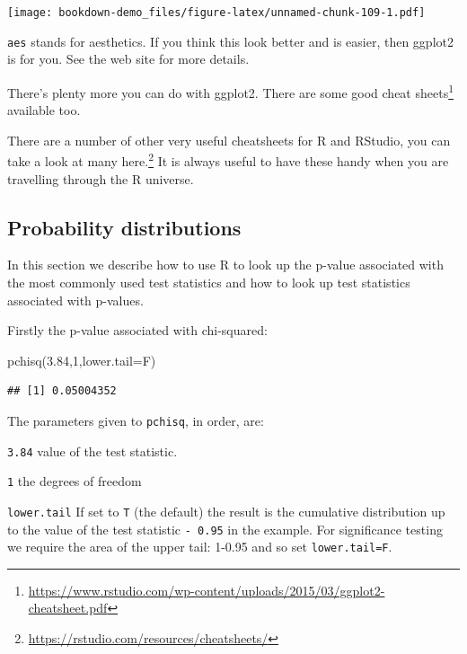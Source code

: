 \documentclass[
]{book}
\makeatletter
\newenvironment{Shaded}{\begin{snugshade}}{\end{snugshade}}
\newcommand{\AttributeTok}[1]{\textcolor[rgb]{0.77,0.63,0.00}{#1}}
\newcommand{\DecValTok}[1]{\textcolor[rgb]{0.00,0.00,0.81}{#1}}
\newcommand{\FloatTok}[1]{\textcolor[rgb]{0.00,0.00,0.81}{#1}}
\newcommand{\FunctionTok}[1]{\textcolor[rgb]{0.00,0.00,0.00}{#1}}
\newcommand{\NormalTok}[1]{#1}
\renewcommand{\href}[2]{#2\footnote{\url{#1}}}
\newenvironment{kframe}{%
\medskip{}
\setlength{\fboxsep}{.8em}
 \def\at@end@of@kframe{}%
 \ifinner\ifhmode%
  \def\at@end@of@kframe{\end{minipage}}%
  \begin{minipage}{\columnwidth}%
 \fi\fi%
 \def\FrameCommand##1{\hskip\@totalleftmargin \hskip-\fboxsep
 \colorbox{shadecolor}{##1}\hskip-\fboxsep
     \hskip-\linewidth \hskip-\@totalleftmargin \hskip\columnwidth}%
 \MakeFramed {\advance\hsize-\width
   \@totalleftmargin\z@ \linewidth\hsize
   \@setminipage}}%
 {\par\unskip\endMakeFramed%
 \at@end@of@kframe}
\newenvironment{rmdblock}[1]
  {
  \begin{itemize}
  \renewcommand{\labelitemi}{
    \raisebox{-.7\height}[0pt][0pt]{
      {\setkeys{Gin}{width=3em,keepaspectratio}\texttt{[image: images/\#1]}}
    }
  }
  \setlength{\fboxsep}{1em}
  \begin{kframe}
  \item
  }
  {
  \end{kframe}
  \end{itemize}
  }
\newenvironment{rmdnote}
  {\begin{rmdblock}{note}}
  {\end{rmdblock}}
\makeatother
\begin{document}
\texttt{[image: bookdown-demo\_files/figure-latex/unnamed-chunk-109-1.pdf]}

\texttt{aes} stands for aesthetics. If you think this look better and is easier, then ggplot2 is for you. See the web site for more details.

There's plenty more you can do with ggplot2. There are some good \href{https://www.rstudio.com/wp-content/uploads/2015/03/ggplot2-cheatsheet.pdf}{cheat sheets} available too.

\begin{rmdnote}
There are a number of other very useful cheatsheets for R and RStudio, you can take a look at many \href{https://rstudio.com/resources/cheatsheets/}{here.} It is always useful to have these handy when you are travelling through the R universe.
\end{rmdnote}

\hypertarget{probability-distributions}{%
\subsection{Probability distributions}\label{probability-distributions}}

In this section we describe how to use R to look up the p-value associated with the most
commonly used test statistics and how to look up test statistics associated with p-values.

Firstly the p-value associated with chi-squared:

\begin{Shaded}
\begin{Highlighting}[]
\FunctionTok{pchisq}\NormalTok{(}\FloatTok{3.84}\NormalTok{,}\DecValTok{1}\NormalTok{,}\AttributeTok{lower.tail=}\NormalTok{F)}
\end{Highlighting}
\end{Shaded}

\begin{verbatim}
## [1] 0.05004352
\end{verbatim}

The parameters given to \texttt{pchisq}, in order, are:

\texttt{3.84} value of the test statistic.

\texttt{1} the degrees of freedom

\texttt{lower.tail} If set to \texttt{T} (the default) the result is the cumulative distribution up to the value of the test statistic \texttt{-\ 0.95} in the example. For significance testing we require the area of the upper tail: 1-0.95 and so set \texttt{lower.tail=F}.
\end{document}
